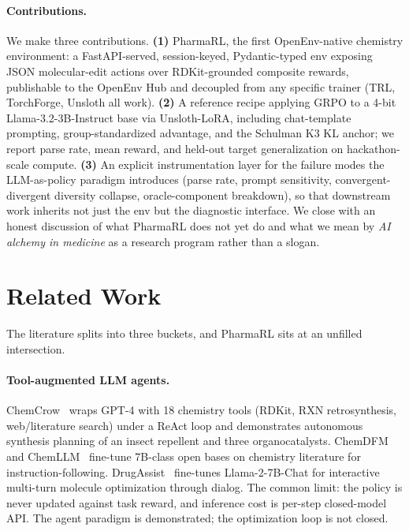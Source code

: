 \documentclass[11pt,a4paper]{article}
\begin{document}
\paragraph{Contributions.} We make three contributions. \textbf{(1)} PharmaRL, the first OpenEnv-native chemistry environment: a FastAPI-served, session-keyed, Pydantic-typed env exposing JSON molecular-edit actions over RDKit-grounded composite rewards, publishable to the OpenEnv Hub and decoupled from any specific trainer (TRL, TorchForge, Unsloth all work). \textbf{(2)} A reference recipe applying GRPO to a 4-bit Llama-3.2-3B-Instruct base via Unsloth-LoRA, including chat-template prompting, group-standardized advantage, and the Schulman K3 KL anchor; we report parse rate, mean reward, and held-out target generalization on hackathon-scale compute. \textbf{(3)} An explicit instrumentation layer for the failure modes the LLM-as-policy paradigm introduces (parse rate, prompt sensitivity, convergent-divergent diversity collapse, oracle-component breakdown), so that downstream work inherits not just the env but the diagnostic interface. We close with an honest discussion of what PharmaRL does not yet do and what we mean by \emph{AI alchemy in medicine} as a research program rather than a slogan.

\section{Related Work}

The literature splits into three buckets, and PharmaRL sits at an unfilled intersection.

\paragraph{Tool-augmented LLM agents.} ChemCrow~\cite{bran2024chemcrow} wraps GPT-4 with 18 chemistry tools (RDKit, RXN retrosynthesis, web/literature search) under a ReAct loop and demonstrates autonomous synthesis planning of an insect repellent and three organocatalysts. ChemDFM~\cite{zhao2024chemdfm} and ChemLLM~\cite{zhang2024chemllm} fine-tune 7B-class open bases on chemistry literature for instruction-following. DrugAssist~\cite{ye2024drugassist} fine-tunes Llama-2-7B-Chat for interactive multi-turn molecule optimization through dialog. The common limit: the policy is never updated against task reward, and inference cost is per-step closed-model API. The agent paradigm is demonstrated; the optimization loop is not closed.
\end{document}
